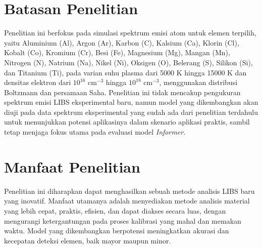 \section{Batasan Penelitian}
Penelitian ini berfokus pada simulasi spektrum emisi atom untuk elemen terpilih, yaitu Aluminium (Al), Argon (Ar), Karbon (C), Kalsium (Ca), Klorin (Cl), Kobalt (Co), Kromium (Cr), Besi (Fe), Magnesium (Mg), Mangan (Mn), Nitrogen (N), Natrium (Na), Nikel (Ni), Oksigen (O), Belerang (S), Silikon (Si), dan Titanium (Ti), pada varian suhu plasma dari 5000 K hingga 15000 K dan densitas elektron dari $10^{16}$ cm$^{-3}$ hingga $10^{18}$ cm$^{-3}$, menggunakan distribusi Boltzmann dan persamaan Saha. Penelitian ini tidak mencakup pengukuran spektrum emisi LIBS eksperimental baru, namun model yang dikembangkan akan diuji pada data spektrum eksperimental yang sudah ada dari penelitian terdahulu untuk menunjukkan potensi aplikasinya dalam skenario aplikasi praktis, sambil tetap menjaga fokus utama pada evaluasi model \textit{Informer}.

\section{Manfaat Penelitian}
Penelitian ini diharapkan dapat menghasilkan sebuah metode analisis LIBS baru yang inovatif. Manfaat utamanya adalah menyediakan metode analisis material yang lebih cepat, praktis, efisien, dan dapat diakses secara luas, dengan mengurangi ketergantungan pada proses kalibrasi yang mahal dan memakan waktu. Model yang dikembangkan berpotensi meningkatkan akurasi dan kecepatan deteksi elemen, baik mayor maupun minor.

